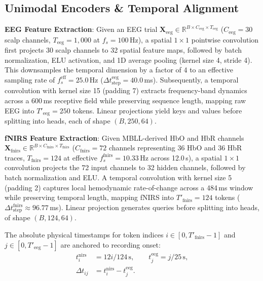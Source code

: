 \documentclass[final,5p,times,twocolumn]{elsarticle}
\begin{document}
\subsection{Unimodal Encoders \& Temporal Alignment}
\textbf{EEG Feature Extraction}: Given an EEG trial $\mathbf{X}_{\text{eeg}} \in \mathbb{R}^{B \times C_{\text{eeg}} \times T_{\text{eeg}}}$ ($C_{\text{eeg}}=30$ scalp channels, $T_{\text{eeg}}=1,000$ at $f_s=100$\,Hz), a spatial $1 \times 1$ pointwise convolution first projects 30 scalp channels to 32 spatial feature maps, followed by batch normalization, ELU activation, and 1D average pooling (kernel size 4, stride 4). This downsamples the temporal dimension by a factor of 4 to an effective sampling rate of $f_s^{\text{eff}} = 25.0$\,Hz ($\Delta t_{\text{step}}^{\text{eeg}} = 40.0$\,ms). Subsequently, a temporal convolution with kernel size 15 (padding 7) extracts frequency-band dynamics across a 600\,ms receptive field while preserving sequence length, mapping raw EEG into $T'_{\text{eeg}} = 250$ tokens. Linear projections yield keys and values before splitting into heads, each of shape $(B,250,64)$.

\textbf{fNIRS Feature Extraction}: Given MBLL-derived HbO and HbR channels $\mathbf{X}_{\text{fnirs}} \in \mathbb{R}^{B \times C_{\text{fnirs}} \times T_{\text{fnirs}}}$ ($C_{\text{fnirs}}=72$ channels representing 36 HbO and 36 HbR traces, $T_{\text{fnirs}}=124$ at effective $f_s^{\text{fnirs}} = 10.33$\,Hz across 12.0\,s), a spatial $1 \times 1$ convolution projects the 72 input channels to 32 hidden channels, followed by batch normalization and ELU. A temporal convolution with kernel size 5 (padding 2) captures local hemodynamic rate-of-change across a 484\,ms window while preserving temporal length, mapping fNIRS into $T'_{\text{fnirs}} = 124$ tokens ($\Delta t_{\text{step}}^{\text{fnirs}} \approx 96.77$\,ms). Linear projection generates queries before splitting into heads, of shape $(B,124,64)$.

The absolute physical timestamps for token indices $i \in [0, T'_{\text{fnirs}}-1]$ and $j \in [0, T'_{\text{eeg}}-1]$ are anchored to recording onset:
\begin{equation}
\begin{aligned}
t_i^{\mathrm{nirs}}&=12i/124\,\mathrm{s},\qquad t_j^{\mathrm{eeg}}=j/25\,\mathrm{s},\\
\Delta t_{ij}&=t_i^{\mathrm{nirs}}-t_j^{\mathrm{eeg}}.
\end{aligned}
\end{equation}
\end{document}
